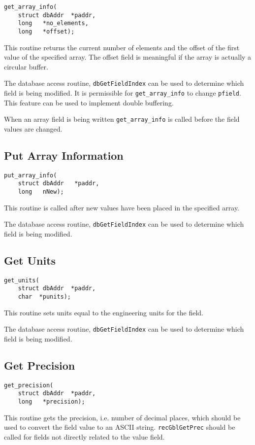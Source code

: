 \begin{verbatim}get_array_info(
    struct dbAddr  *paddr,
    long   *no_elements,
    long   *offset);
\end{verbatim}This routine returns the current number of elements and the offset of the first value of the specified array. The offset field 
is meaningful if the array is actually a circular buffer.

The database access routine, \verb|dbGetFieldIndex| can be used to determine which field is being modified. It is 
permissible for \verb|get_array_info| to change \verb|pfield|. This feature can be used to implement double buffering.

When an array field is being written \verb|get_array_info| is called before the field values are changed.

\subsection{Put Array Information}

\begin{verbatim}
put_array_info(
    struct dbAddr   *paddr,
    long   nNew);
\end{verbatim}This routine is called after new values have been placed in the specified array.

The database access routine, \verb|dbGetFieldIndex| can be used to determine which field is being modified.

\subsection{Get Units}

\begin{verbatim}
get_units(
    struct dbAddr  *paddr,
    char  *punits);
\end{verbatim}This routine sets units equal to the engineering units for the field.

The database access routine, \verb|dbGetFieldIndex| can be used to determine which field is being modified.

\subsection{Get Precision}

\begin{verbatim}
get_precision(
    struct dbAddr  *paddr,
    long   *precision);
\end{verbatim}This routine gets the precision, i.e. number of decimal places, which should be used to convert the field value to an ASCII 
string. \verb|recGblGetPrec| should be called for fields not directly related to the value field.

